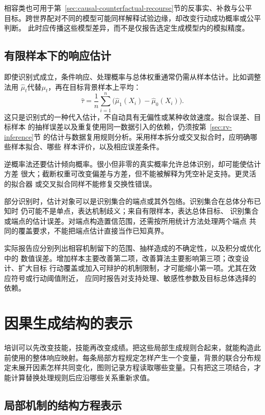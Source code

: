 相容类也可用于第~\ref{sec:causal-counterfactual-recourse}节的反事实、补救与公平
目标。跨世界配对不同的模型可能同样解释试验边缘，却改变行动成功概率或公平判断。
此时应传播这些模型差异，而不是仅报告选定生成模型内的模拟精度。

\subsection{有限样本下的响应估计}
\label{sec:causal-response-estimation}

即使识别式成立，条件响应、处理概率与总体权重通常仍需从样本估计。比如调整法用
\(\widehat\mu_t\)代替\(\mu_t\)，再在目标背景样本上平均：
\[
  \widehat\tau
  =\frac1n\sum_{i=1}^n
    \bigl(\widehat\mu_1(X_i)-\widehat\mu_0(X_i)\bigr).
\]
这只是识别式的一种代入估计，不自动具有无偏性或某种收敛速度。拟合误差、目标样本
的抽样误差以及重复使用同一数据引入的依赖，仍须按第~\ref{sec:rv-inference}节
的估计与数据复用规则分析。采用样本拆分或交叉拟合时，应明确哪些样本拟合、哪些
样本评价，以及相应误差条件。

逆概率法还要估计倾向概率。很小但非零的真实概率允许总体识别，却可能使估计方差
很大；截断权重可改变偏差与方差，但不能被解释为凭空补足支持。更灵活的拟合器
或交叉拟合同样不能修复交换性错误。

部分识别时，估计对象可以是识别集合的端点或其外包络。识别集合在总体分布已知时
仍可能不是单点，表达机制歧义；来自有限样本，表达总体目标、
识别集合或端点的估计误差。对端点构造置信范围，还需按所用统计方法处理两个端点
共同的覆盖要求，不能把端点估计直接当作已知真界。

实际报告应分别列出相容机制留下的范围、抽样造成的不确定性，以及积分或优化中的
数值误差。增加样本主要改善第二项，改善算法主要影响第三项；改变设计、扩大目标
行动覆盖或加入可辩护的机制限制，才可能缩小第一项。尤其在效应符号或行动阈值附近，
应同时报告对支持处理、敏感性参数及目标总体选择的依赖。

\section{因果生成结构的表示}
\label{sec:causal-generating-structure}

培训可以先改变技能，技能再改变成绩。把这些局部生成规则合起来，就能构造此前使用的整体响应映射。每条局部方程规定怎样产生一个变量，背景的联合分布规定未展开因素怎样共同变化，图则记录方程读取哪些变量。只有把这三项结合，才能计算替换处理规则后应沿哪些关系重新求值。

\subsection{局部机制的结构方程表示}
\label{sec:causal-local-structural-equations}

